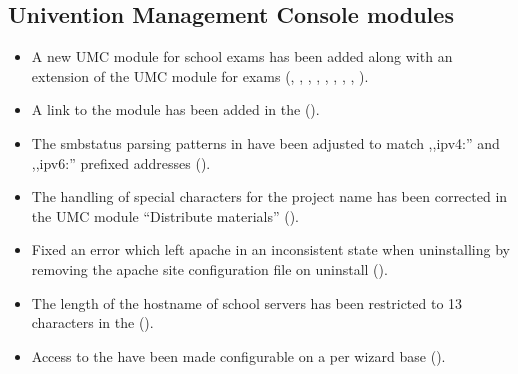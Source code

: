 %

%

\subsection{Univention Management Console modules}
\begin{itemize}
\item A new UMC module for school exams has been added along with an extension
  of the UMC  module for exams (,
  , , , , , , , ).
\item A link to the  module has been added in the  ().
\item The smbstatus parsing patterns in  have been adjusted to match ,,ipv4:'' and ,,ipv6:'' prefixed addresses ().
\item The handling of special characters for the project name has been corrected in the UMC module ``Distribute materials'' ().
\item Fixed an error which left apache in an inconsistent state when uninstalling  by removing the  apache site configuration file on uninstall ().
\item The length of the hostname of school servers has been restricted to 13 characters in the  ().
\item Access to the  have been made configurable on a per wizard base ().
\end{itemize}

